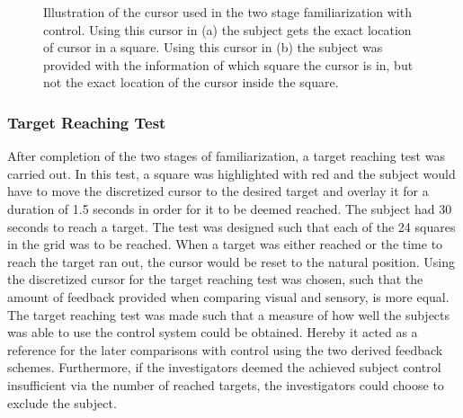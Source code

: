 \begin{figure}[H]
	\hspace{0.9cm}
	\caption{Illustration of the cursor used in the two stage familiarization with control.  Using this cursor in (a) the subject gets the exact location of cursor in a square. Using this cursor in (b) the subject was provided with the information of which square the cursor is in, but not the exact location of the cursor inside the square. }
	\label{fig:C1}
\end{figure}

\subsubsection{Target Reaching Test}

After completion of the two stages of familiarization, a target reaching test was carried out. In this test, a square was highlighted with red and the subject would have to move the discretized cursor to the desired target and overlay it for a duration of 1.5 seconds in order for it to be deemed reached. The subject had 30 seconds to reach a target. The test was designed such that each of the 24 squares in the grid was to be reached. When a target was either reached or the time to reach the target ran out, the cursor would be reset to the natural position. Using the discretized cursor for the target reaching test was chosen, such that the amount of feedback provided when comparing visual and sensory, is more equal.  \\
The target reaching test was made such that a measure of how well the subjects was able to use the control system could be obtained. Hereby it acted as a reference for the later comparisons with control using the two derived feedback schemes. Furthermore, if the investigators deemed the achieved subject control insufficient via the number of reached targets, the investigators could choose to exclude the subject.       













